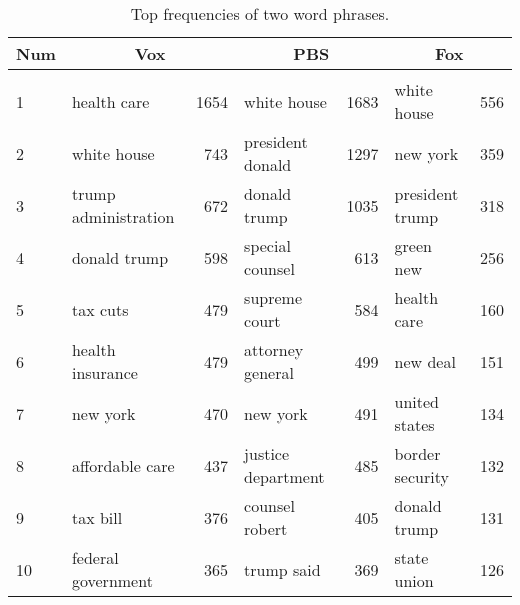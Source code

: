 \begin{table}[H]
    \centering
    \caption{Top frequencies of two word phrases.}
    \label{tab:2gram}
    \begin{tabular}{l|lr|lr|lr}
    \hline
    \textbf{Num} & \multicolumn{2}{c|}{\textbf{Vox}}           & \multicolumn{2}{c|}{\textbf{PBS}}          & \multicolumn{2}{c}{\textbf{Fox}} \\ \hline \hline
    &&&&&& \\
    1   & health care          & 1654 & white house        & 1683 & white house     & 556 \\
    2   & white house          & 743  & president donald   & 1297 & new york        & 359 \\
    3   & trump administration & 672  & donald trump       & 1035 & president trump & 318 \\
    4   & donald trump         & 598  & special counsel    & 613  & green new       & 256 \\
    5   & tax cuts             & 479  & supreme court      & 584  & health care     & 160 \\
    6   & health insurance     & 479  & attorney general   & 499  & new deal        & 151 \\
    7   & new york             & 470  & new york           & 491  & united states   & 134 \\
    8   & affordable care      & 437  & justice department & 485  & border security & 132 \\
    9   & tax bill             & 376  & counsel robert     & 405  & donald trump    & 131 \\
    10  & federal government   & 365  & trump said         & 369  & state union     & 126 \\ \hline
    \end{tabular}
\end{table}